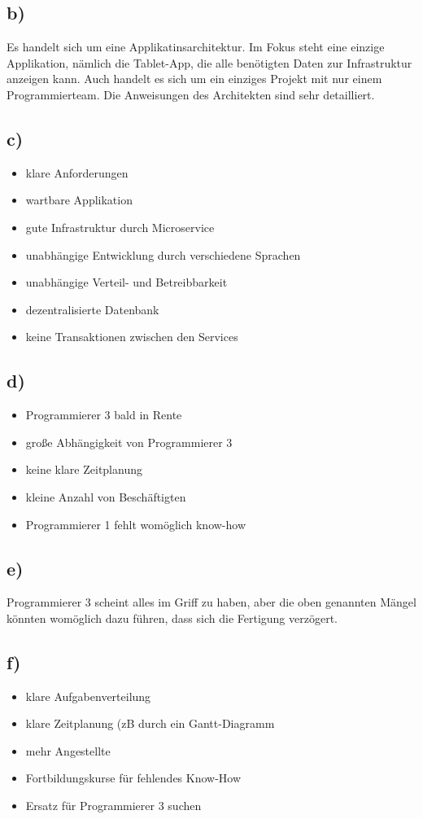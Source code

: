 \documentclass[12pt,pdftex,a4paper]{article}
\begin{document}
\subsection*{b)}
Es handelt sich um eine Applikatinsarchitektur. Im Fokus steht eine einzige Applikation, nämlich die Tablet-App, die alle benötigten Daten zur Infrastruktur anzeigen kann. Auch handelt es sich um ein einziges Projekt mit nur einem Programmierteam. Die Anweisungen des Architekten sind sehr detailliert.
\subsection*{c)}
\begin{itemize}
\item klare Anforderungen
\item wartbare Applikation
\item gute Infrastruktur durch Microservice
\item unabhängige Entwicklung durch verschiedene Sprachen
\item unabhängige Verteil- und Betreibbarkeit
\item dezentralisierte Datenbank
\item keine Transaktionen zwischen den Services
\end{itemize}
\subsection*{d)}
\begin{itemize}
\item Programmierer 3 bald in Rente
\item große Abhängigkeit von Programmierer 3
\item keine klare Zeitplanung
\item kleine Anzahl von Beschäftigten
\item Programmierer 1 fehlt womöglich know-how
\end{itemize}
\subsection*{e)}
Programmierer 3 scheint alles im Griff zu haben, aber die oben genannten Mängel könnten womöglich dazu führen, dass sich die Fertigung verzögert.
\subsection*{f)}
\begin{itemize}
\item klare Aufgabenverteilung
\item klare Zeitplanung (zB durch ein Gantt-Diagramm
\item mehr Angestellte
\item Fortbildungskurse für fehlendes Know-How
\item Ersatz für Programmierer 3 suchen
\end{itemize}
\end{document}
